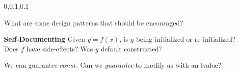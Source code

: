 \begin{frame}{}
{\begin{minipage}{.96\textwidth}
\begin{lightquadblockc}{0,0.1,0.1}{\parbox{21cm}{\centering \vspace{10pt}What are some design patterns that should be encouraged?\vspace{3pt}}}
\begin{center}
\begin{minipage}{1.03\textwidth}
{\begin{enumerate}
{\vsp}

\dmitem \textbf{Self-Documenting}  \hspace{.5em} Given $y = f(x)$, 
is $y$ being initialized or re-initialized?  Does $f$ have side-effects? 
Was $y$ default constructed?  

{\vsp}

\dmitem We 
can guarantee $const$.  Can we \textsl{guarantee} to modify 
as with an lvalue? 
 



\end{enumerate}
}\end{minipage}
\end{center}
\end{lightquadblockc}
\end{minipage}

}

\end{frame}

